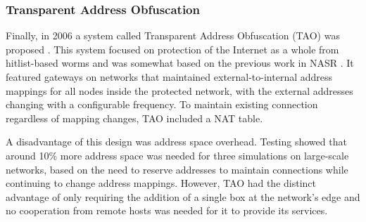 \subsubsection{Transparent Address Obfuscation}
\par Finally, in 2006 a system called Transparent Address Obfuscation (TAO) was proposed \cite{TAO}. This system focused on protection of the Internet as a whole from hitlist-based worms and was somewhat based on the previous work in NASR \cite{NASR}. It featured gateways on networks that maintained external-to-internal address mappings for all nodes inside the protected network, with the external addresses changing with a configurable frequency. To maintain existing connection regardless of mapping changes, TAO included a NAT table. 

\par A disadvantage of this design was address space overhead. Testing showed that around 10\% more address space was needed for three simulations on large-scale networks, based on the need to reserve addresses to maintain connections while continuing to change address mappings. However, TAO had the distinct advantage of only requiring the addition of a single box at the network's edge and no cooperation from remote hosts was needed for it to provide its services.
